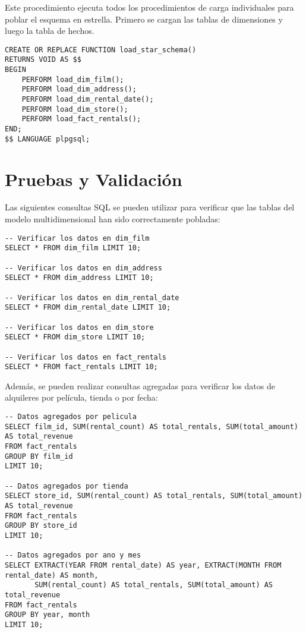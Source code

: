 \documentclass{article}
\begin{document}
Este procedimiento ejecuta todos los procedimientos de carga individuales para poblar el esquema en estrella. Primero se cargan las tablas de dimensiones y luego la tabla de hechos.

\begin{lstlisting}
CREATE OR REPLACE FUNCTION load_star_schema()
RETURNS VOID AS $$
BEGIN
    PERFORM load_dim_film();
    PERFORM load_dim_address();
    PERFORM load_dim_rental_date();
    PERFORM load_dim_store();
    PERFORM load_fact_rentals();
END;
$$ LANGUAGE plpgsql;
\end{lstlisting}

\newpage
\section{Pruebas y Validación}

Las siguientes consultas SQL se pueden utilizar para verificar que las tablas del modelo multidimensional han sido correctamente pobladas:

\begin{lstlisting}
-- Verificar los datos en dim_film
SELECT * FROM dim_film LIMIT 10;

-- Verificar los datos en dim_address
SELECT * FROM dim_address LIMIT 10;

-- Verificar los datos en dim_rental_date
SELECT * FROM dim_rental_date LIMIT 10;

-- Verificar los datos en dim_store
SELECT * FROM dim_store LIMIT 10;

-- Verificar los datos en fact_rentals
SELECT * FROM fact_rentals LIMIT 10;
\end{lstlisting}

Además, se pueden realizar consultas agregadas para verificar los datos de alquileres por película, tienda o por fecha:

\begin{lstlisting}
-- Datos agregados por pelicula
SELECT film_id, SUM(rental_count) AS total_rentals, SUM(total_amount) AS total_revenue
FROM fact_rentals
GROUP BY film_id
LIMIT 10;

-- Datos agregados por tienda
SELECT store_id, SUM(rental_count) AS total_rentals, SUM(total_amount) AS total_revenue
FROM fact_rentals
GROUP BY store_id
LIMIT 10;

-- Datos agregados por ano y mes
SELECT EXTRACT(YEAR FROM rental_date) AS year, EXTRACT(MONTH FROM rental_date) AS month, 
       SUM(rental_count) AS total_rentals, SUM(total_amount) AS total_revenue
FROM fact_rentals
GROUP BY year, month
LIMIT 10;
\end{lstlisting}
\end{document}
